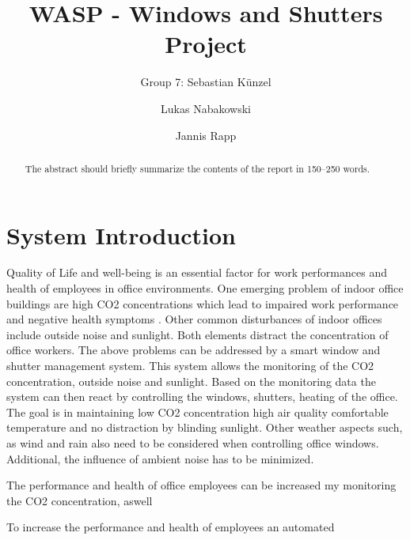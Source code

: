 \documentclass[runningheads]{llncs}
\begin{document}
%
\title{WASP - Windows and Shutters Project}

\author{Group 7: Sebastian Künzel \and
Lukas Nabakowski \and
Jannis Rapp}

%
\maketitle              %
%
\begin{abstract}
The abstract should briefly summarize the contents of the report in
150--250 words. 

\end{abstract}
%
%
%
\section{System Introduction}



Quality of Life and well-being is an essential factor for work performances and health of employees in office environments. One emerging problem of indoor office buildings are high CO2 concentrations which lead to impaired work performance and negative health symptoms \cite{indoor_polutionCO2}. Other common disturbances of indoor offices include outside noise and sunlight. Both elements distract the concentration of office workers. 
\newline
The above problems can be addressed by a smart window and shutter management system. 
This system allows the monitoring of the CO2 concentration, outside noise and sunlight.
Based on the monitoring data the system can then react by controlling the windows, shutters, heating of the office. 
\newline
The goal is in maintaining low CO2 concentration high air quality comfortable temperature and no distraction by blinding sunlight. Other weather aspects such, as wind and rain also need to be considered when controlling office windows. Additional, the influence of ambient noise has to be minimized. 




The performance and health of office employees can be increased my monitoring the CO2 concentration, aswell   

To increase the performance and health of employees an automated  
\end{document}
